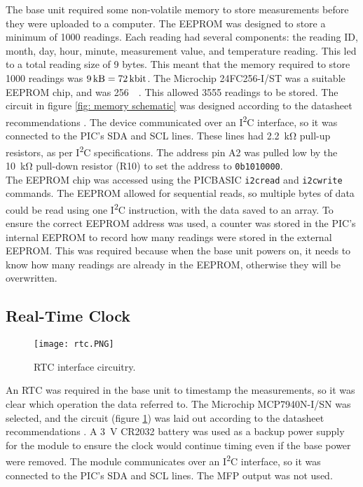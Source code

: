 The base unit required some non-volatile memory to store measurements before they were uploaded to a computer. The EEPROM was designed to store a minimum of 1000 readings. Each reading had several components: the reading ID, month, day, hour, minute, measurement value, and temperature reading. This led to a total reading size of 9 bytes. This meant that the memory required to store 1000 readings was $\SI{9}{\kilo\byte}=\SI{72}{\kilo\bit}$. The Microchip 24FC256-I/ST \cite{memory} was a suitable EEPROM chip, and was \SI{256}{\kilo\bit}. This allowed 3555 readings to be stored. The circuit in figure \ref{fig: memory schematic} was designed according to the datasheet recommendations \cite{memory}. The device communicated over an I\textsuperscript{2}C interface, so it was connected to the PIC's SDA and SCL lines. These lines had \SI{2.2}{\kilo\ohm} pull-up resistors, as per I\textsuperscript{2}C specifications. The address pin A2 was pulled low by the \SI{10}{\kilo\ohm} pull-down resistor (R10) to set the address to \verb|0b1010000|.\\

The EEPROM chip was accessed using the PICBASIC \verb|i2cread| and \verb|i2cwrite| commands. The EEPROM allowed for sequential reads, so multiple bytes of data could be read using one I\textsuperscript{2}C instruction, with the data saved to an array. To ensure the correct EEPROM address was used, a counter was stored in the PIC's internal EEPROM to record how many readings were stored in the external EEPROM. This was required because when the base unit powers on, it needs to know how many readings are already in the EEPROM, otherwise they will be overwritten.





\subsection{Real-Time Clock}
\begin{figure}[htb]
	\centering
	\texttt{[image: rtc.PNG]}
	\caption{RTC interface circuitry.}
	\label{fig: rtc schematic}
\end{figure}

An RTC was required in the base unit to timestamp the measurements, so it was clear which operation the data referred to. The Microchip MCP7940N-I/SN \cite{rtc} was selected, and the circuit (figure \ref{fig: rtc schematic}) was laid out according to the datasheet recommendations \cite{rtc}. A \SI{3}{\volt} CR2032 battery was used as a backup power supply for the module to ensure the clock would continue timing even if the base power were removed. The module communicates over an I\textsuperscript{2}C interface, so it was connected to the PIC's SDA and SCL lines. The MFP output was not used.





